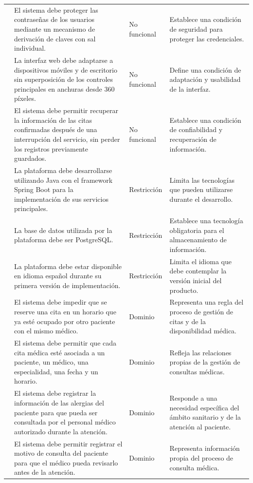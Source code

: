 \documentclass[12pt,a4paper]{article}
\begin{document}
\begin{longtable}{>{\centering\arraybackslash}p{0.55cm}p{6.0cm}p{2.2cm}p{5.0cm}}
9 & El sistema debe proteger las contraseñas de los usuarios mediante un mecanismo de derivación de claves con sal individual. & No funcional & Establece una condición de seguridad para proteger las credenciales.\\
10 & La interfaz web debe adaptarse a dispositivos móviles y de escritorio sin superposición de los controles principales en anchuras desde 360 píxeles. & No funcional & Define una condición de adaptación y usabilidad de la interfaz.\\
11 & El sistema debe permitir recuperar la información de las citas confirmadas después de una interrupción del servicio, sin perder los registros previamente guardados. & No funcional & Establece una condición de confiabilidad y recuperación de información.\\
12 & La plataforma debe desarrollarse utilizando Java con el framework Spring Boot para la implementación de sus servicios principales. & Restricción & Limita las tecnologías que pueden utilizarse durante el desarrollo.\\
13 & La base de datos utilizada por la plataforma debe ser PostgreSQL. & Restricción & Establece una tecnología obligatoria para el almacenamiento de información.\\
14 & La plataforma debe estar disponible en idioma español durante su primera versión de implementación. & Restricción & Limita el idioma que debe contemplar la versión inicial del producto.\\
15 & El sistema debe impedir que se reserve una cita en un horario que ya esté ocupado por otro paciente con el mismo médico. & Dominio & Representa una regla del proceso de gestión de citas y de la disponibilidad médica.\\
16 & El sistema debe permitir que cada cita médica esté asociada a un paciente, un médico, una especialidad, una fecha y un horario. & Dominio & Refleja las relaciones propias de la gestión de consultas médicas.\\
17 & El sistema debe registrar la información de las alergias del paciente para que pueda ser consultada por el personal médico autorizado durante la atención. & Dominio & Responde a una necesidad específica del ámbito sanitario y de la atención al paciente.\\
18 & El sistema debe permitir registrar el motivo de consulta del paciente para que el médico pueda revisarlo antes de la atención. & Dominio & Representa información propia del proceso de consulta médica.\\
\end{longtable}
\normalsize
\end{document}
